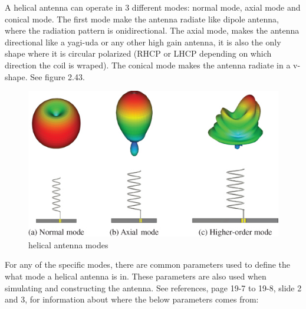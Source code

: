 A helical antenna can operate in 3 different modes: normal mode, axial mode and conical mode. The first mode make the antenna radiate like dipole antenna, where the radiation pattern is onidirectional. The axial mode, makes the antenna directional like a yagi-uda or any other high gain antenna, it is also the only shape where it is circular polarized (RHCP or LHCP depending on which direction the coil is wraped). The conical mode makes the antenna radiate in a v-shape. See figure 2.43. 

\begin{figure}[h]
\centering
\includegraphics[scale=1.3]{figures/HelicalMode.png}
\caption{helical antenna modes\cite{HelicalMode}}
\end{figure}

For any of the specific modes, there are common parameters used to define the what mode a helical antenna is in. These parameters are also used when simulating and constructing the antenna. See references, \cite{ARRL} page 19-7 to 19-8, \cite{HelicalModeMath} slide 2 and 3, for information about where the below parameters comes from:

